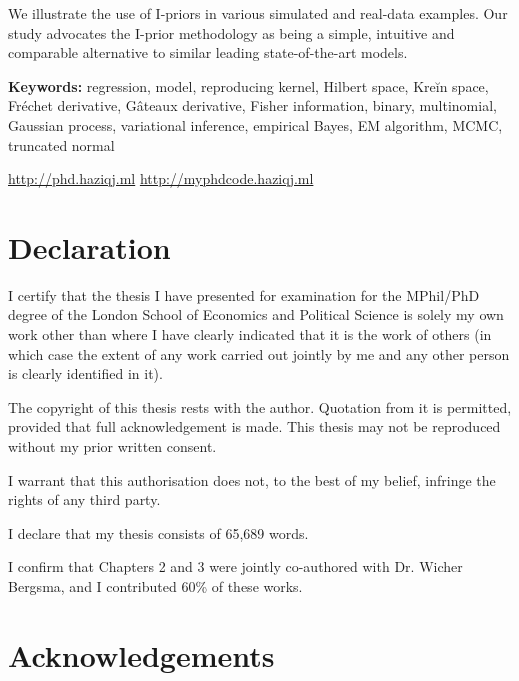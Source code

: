 \documentclass[11pt,twoside,openright,showframe]{report}
\begin{document}
We illustrate the use of I-priors in various simulated and real-data examples. 
Our study advocates the I-prior methodology as being a simple, intuitive and comparable alternative to similar leading state-of-the-art models. 


\vspace{1em}
{\noindent\textbf{Keywords:} 
	regression, model, reproducing kernel, Hilbert space, Kreĭn space, Fréchet derivative, Gâteaux derivative, Fisher information, binary, multinomial, Gaussian process, variational inference, empirical Bayes, EM algorithm, MCMC, truncated normal
}

\vfill

\begin{center}
  \url{http://phd.haziqj.ml} \textbullet{} \url{http://myphdcode.haziqj.ml}
\end{center}

\chapter*{Declaration} 

I certify that the thesis I have presented for examination for the MPhil/PhD degree of the London School of Economics and Political Science is solely my own work other than where I have clearly indicated that it is the work of others (in which case the extent of any work carried out jointly by me and any other person is clearly identified in it).

The copyright of this thesis rests with the author. Quotation from it is permitted, provided that full acknowledgement is made. 
This thesis may not be reproduced without my prior written consent.

I warrant that this authorisation does not, to the best of my belief, infringe the rights of any third party.

I declare that my thesis consists of 65,689 words.

I confirm that Chapters 2 and 3 were jointly co-authored with Dr. Wicher Bergsma, and I contributed 60\% of these works.


\chapter*{Acknowledgements} 
\end{document}
